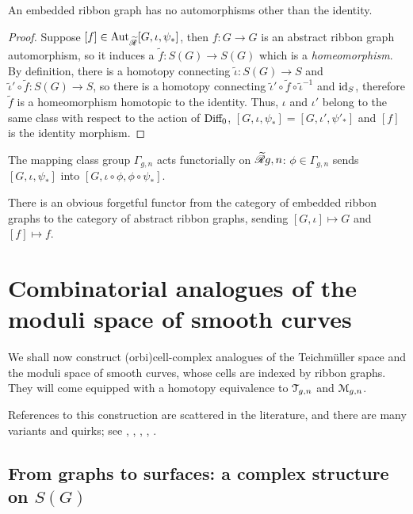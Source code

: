 \begin{lemma}
  \label{lemma:erg-no-aut}
  An embedded ribbon graph has no automorphisms other than the identity.
\end{lemma}
\begin{proof}
  Suppose $[f] \in \operatorname{Aut}_{\mathscr{\widetilde R}_{}}[G, \iota, \psi_*]$, then $f:G\to G$ is an abstract
  ribbon graph automorphism, so it induces a ${\tilde f}: S(G) \to S(G)$
  which is a \emph{homeomorphism}.  By definition, there is a homotopy
  connecting ${\tilde \iota}: S(G) \to S$ and ${\tilde \iota'} \circ {\tilde f}:
  S(G)\to S$, so there is a homotopy connecting ${\tilde \iota'} \circ {\tilde f}
  \circ {\tilde \iota}^{-1}$ and $\operatorname{id}_S$, therefore ${\tilde f}$ is a
  homeomorphism homotopic to the identity.  Thus, $\iota$ and $\iota'$ belong
  to the same class with respect to the action of $\textrm{Diff}_0$, $[G, \iota,
  \psi_*] = [G, \iota', \psi'_*]$ and $[f]$ is the identity morphism.
\end{proof}

The mapping class group $\Gamma_{g,n}$ acts functorially on $\mathscr{\widetilde R}_{}{g,n}$: $\phi
\in \Gamma_{g,n}$ sends $[G, \iota, \psi_*]$ into $[G, \iota \circ \phi, \phi \circ \psi_*]$.

There is an obvious forgetful functor from the category of embedded
ribbon graphs to the category of abstract ribbon graphs, sending $[G,
\iota] \mapsto G$ and $[f] \mapsto f$.



\section{Combinatorial analogues of the moduli space of smooth curves}
\label{sec:mgn-comb}

We shall now construct (orbi)cell-complex analogues of the Teichm\"uller
space and the moduli space of smooth curves, whose cells are indexed
by ribbon graphs.  They will come equipped with a homotopy
equivalence to $\mathcal{T}_{g,n}$ and $\mathcal{M}_{g,n}$.

References to this construction are scattered in the literature, and
there are many variants and quirks; see
\cite{harer;cohomology-of-moduli},
\cite{harer;cohomological-dimension},
\cite{kontsevich;intersection-theory;1992},
\cite{looijenga;cellular-decomposition},
\cite{penner:math.GT/0210326}.


\subsection{From graphs to surfaces: a complex structure on $S(G)$}
\label{sec:atlas}

